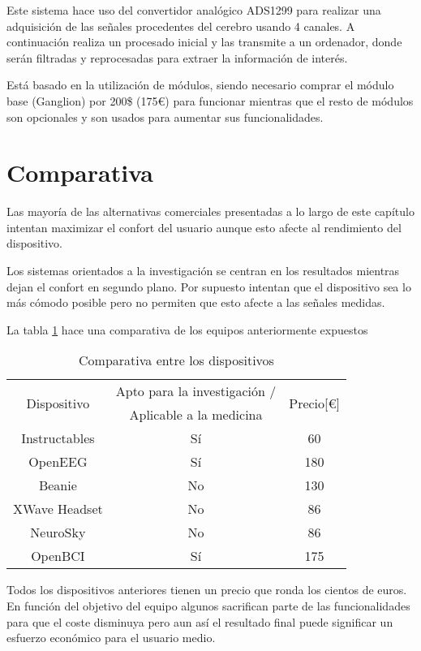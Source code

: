 Este sistema hace uso del convertidor analógico ADS1299 para realizar una adquisición de las señales procedentes del cerebro usando 4 canales. A continuación realiza un procesado inicial y las transmite a un ordenador, donde serán filtradas y reprocesadas para extraer la información de interés.

Está basado en la utilización de módulos, siendo necesario comprar el módulo base (Ganglion) por 200\$ (175€) para funcionar mientras que el resto de módulos son opcionales y son usados para aumentar sus funcionalidades.

\section{Comparativa\label{sec:EdA_comparativa}}

Las mayoría de las alternativas comerciales presentadas a lo largo de este capítulo intentan maximizar el confort del usuario aunque esto afecte al rendimiento del dispositivo. 

Los sistemas orientados a la investigación se centran en los resultados mientras dejan el confort en segundo plano. Por supuesto intentan que el dispositivo sea lo más cómodo posible pero no permiten que esto afecte a las señales medidas.

La tabla \ref{tab:EdA_Comparativa} hace una comparativa de los equipos anteriormente expuestos

\begin{table} [H]
\centering
\begin{tabular}{|c|c|c|}
\hline
\multirow{2}{*}{Dispositivo} 	& Apto para la investigación / 	& \multirow{2}{*}{Precio[€]} \\
 								& Aplicable a la medicina 		&  \\
\hline
Instructables & Sí\footnotemark{} & 60 \\
\hline
OpenEEG & Sí & 180 \\
\hline
Beanie & No & 130 \\
\hline
XWave Headset & No & 86 \\
\hline
NeuroSky & No & 86 \\
\hline
OpenBCI & Sí & 175 \\
\hline
\end{tabular}
\label{tab:EdA_Comparativa}
\caption{Comparativa entre los dispositivos}
\end{table}


Todos los dispositivos anteriores tienen un precio que ronda los cientos de euros. En función del objetivo del equipo algunos sacrifican parte de las funcionalidades para que el coste disminuya pero aun así el resultado final puede significar un esfuerzo económico para el usuario medio.
